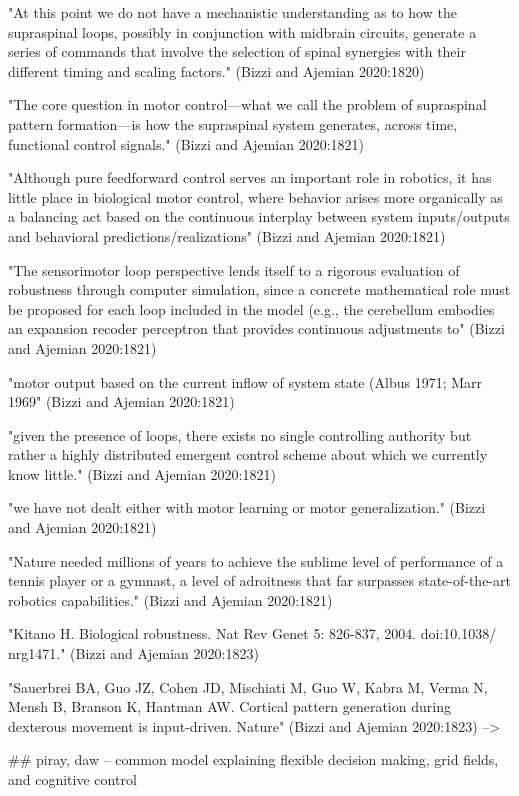 \documentclass[../main.tex]{subfiles}
\begin{document}
{{"At this point we do not have a mechanistic understanding as to how the supraspinal loops, possibly in conjunction with midbrain circuits, generate a series of commands that involve the selection of spinal synergies with their different timing and scaling factors." (Bizzi and Ajemian 2020:1820)

"The core question in motor control—what we call the problem of supraspinal pattern formation—is how the supraspinal system generates, across time, functional control signals." (Bizzi and Ajemian 2020:1821)

"Although pure feedforward control serves an important role in robotics, it has little place in biological motor control, where behavior arises more organically as a balancing act based on the continuous interplay between system inputs/outputs and behavioral predictions/realizations" (Bizzi and Ajemian 2020:1821)

"The sensorimotor loop perspective lends itself to a rigorous evaluation of robustness through computer simulation, since a concrete mathematical role must be proposed for each loop included in the model (e.g., the cerebellum embodies an expansion recoder perceptron that provides continuous adjustments to" (Bizzi and Ajemian 2020:1821)

"motor output based on the current inflow of system state (Albus 1971; Marr 1969" (Bizzi and Ajemian 2020:1821)

"given the presence of loops, there exists no single controlling authority but rather a highly distributed emergent control scheme about which we currently know little." (Bizzi and Ajemian 2020:1821)

"we have not dealt either with motor learning or motor generalization." (Bizzi and Ajemian 2020:1821)

"Nature needed millions of years to achieve the sublime level of performance of a tennis player or a gymnast, a level of adroitness that far surpasses state-of-the-art robotics capabilities." (Bizzi and Ajemian 2020:1821)

"Kitano H. Biological robustness. Nat Rev Genet 5: 826-837, 2004. doi:10.1038/ nrg1471." (Bizzi and Ajemian 2020:1823)

"Sauerbrei BA, Guo JZ, Cohen JD, Mischiati M, Guo W, Kabra M, Verma N, Mensh B, Branson K, Hantman AW. Cortical pattern generation during dexterous movement is input-driven. Nature" (Bizzi and Ajemian 2020:1823) -->


## piray, daw -- common model explaining flexible decision making, grid fields, and cognitive control



}}
\end{document}
